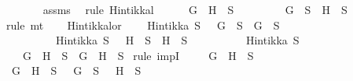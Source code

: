 \begin{isabellebody}
\ \ \ \ \ \ \isamarkupfalse%
\ assms{\isacharparenleft}{}{\isacharparenright}\ \isamarkupfalse%
\ {\isacharparenleft}rule\ Hintikka{\isacharunderscore}l{}{\isacharparenright}\isanewline
\ \ \ \ \isamarkupfalse%
\ {\isachardoublequoteopen}G\ \isactrlbold {\isasymand}\ H\ {\isasymnotin}\ S{\isachardoublequoteclose}\isanewline
\ \ \ \ \ \ \isamarkupfalse%
\ {\isacartoucheopen}{\isasymnot}\ {\isacharparenleft}G\ {\isasymin}\ S\ {\isasymand}\ H\ {\isasymin}\ S{\isacharparenright}{\isacartoucheclose}\ \isamarkupfalse%
\ {\isacharparenleft}rule\ mt{\isacharparenright}\isanewline
\ \ \isamarkupfalse%
\isanewline
{}\isamarkupfalse%
%
\endisatagproof
{\isafoldproof}%
%
\isadelimproof
\isanewline
%
\endisadelimproof
\isanewline
{}\isamarkupfalse%
\ Hintikka{\isacharunderscore}l{}{}{\isacharunderscore}or{\isacharcolon}\ \isanewline
\ \ \ {\isachardoublequoteopen}Hintikka\ S\ {\isasymLongrightarrow}\ \isactrlbold {\isasymnot}\ G\ {\isasymin}\ S\ {\isasymlongrightarrow}\ G\ {\isasymnotin}\ S{\isachardoublequoteclose}\isanewline
\ \ \ \ \ \ \ \ \ \ {\isachardoublequoteopen}Hintikka\ S\ {\isasymLongrightarrow}\ \isactrlbold {\isasymnot}\ H\ {\isasymin}\ S\ {\isasymlongrightarrow}\ H\ {\isasymnotin}\ S{\isachardoublequoteclose}\isanewline
\ \ \ \ \ \ \ \ \ \ {\isachardoublequoteopen}Hintikka\ S{\isachardoublequoteclose}\isanewline
\ \ \ {\isachardoublequoteopen}\isactrlbold {\isasymnot}\ {\isacharparenleft}G\ \isactrlbold {\isasymor}\ H{\isacharparenright}\ {\isasymin}\ S\ {\isasymlongrightarrow}\ G\ \isactrlbold {\isasymor}\ H\ {\isasymnotin}\ S{\isachardoublequoteclose}\isanewline
%
\isadelimproof
%
\endisadelimproof
%
\isatagproof
{}\isamarkupfalse%
\ {\isacharparenleft}rule\ impI{\isacharparenright}\isanewline
\ \ \isamarkupfalse%
\ {\isachardoublequoteopen}\isactrlbold {\isasymnot}\ {\isacharparenleft}G\ \isactrlbold {\isasymor}\ H{\isacharparenright}\ {\isasymin}\ S{\isachardoublequoteclose}\isanewline
\ \ \isamarkupfalse%
\ {\isachardoublequoteopen}\isactrlbold {\isasymnot}\ {\isacharparenleft}G\ \isactrlbold {\isasymor}\ H{\isacharparenright}\ {\isasymin}\ S\ {\isasymlongrightarrow}\ {\isacharparenleft}\isactrlbold {\isasymnot}\ G\ {\isasymin}\ S\ {\isasymand}\ \isactrlbold {\isasymnot}\ H\ {\isasymin}\ S{\isacharparenright}{\isachardoublequoteclose}\isanewline
\ \ \ \ \isamarkupfalse%

\end{isabellebody}
